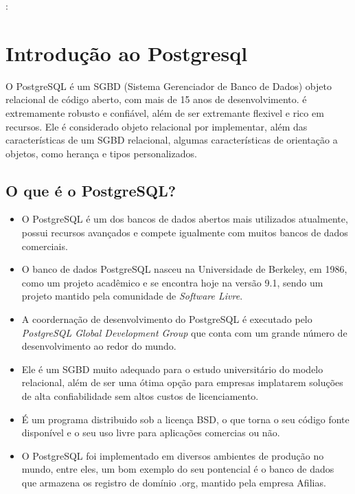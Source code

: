:\newpage \chapter{Introdução ao Postgresql}\setcounter{SteP}{1}

    O PostgreSQL é um SGBD (Sistema Gerenciador de Banco de
Dados) objeto relacional de código aberto, com mais de 15 anos
de desenvolvimento. é extremamente robusto e confiável, além de
ser extremante flexivel e rico em recursos. Ele é considerado 
objeto relacional por implementar, além das características de
um SGBD relacional, algumas características de orientação a
objetos, como herança e tipos personalizados.

\section{O que é o PostgreSQL?}\setcounter{SteP}{1}

\begin{itemize}
\item{\bf } O PostgreSQL é um dos bancos de dados abertos mais utilizados
atualmente, possui recursos avançados e compete igualmente com
muitos bancos de dados comerciais.

\item{\bf } O banco de dados PostgreSQL nasceu na Universidade de Berkeley,
em 1986, como um projeto acadêmico e se encontra hoje na versão 9.1, 
sendo um projeto mantido pela comunidade de {\it Software Livre}.

\item{\bf }A coordernação de desenvolvimento do PostgreSQL é executado pelo 
{\it PostgreSQL Global Development Group} que conta com um grande 
número de desenvolvimento ao redor do mundo.

\item{\bf } Ele é um SGBD muito adequado para o estudo universitário do 
modelo relacional, além de ser uma ótima opção para empresas 
implatarem soluções de alta confiabilidade sem altos custos de 
licenciamento.

\item{\bf } É um programa distribuido sob a licença BSD, o que 
torna o seu código fonte disponível e o seu uso livre para aplicações
comercias ou não.

\item{\bf } O PostgreSQL foi implementado em diversos ambientes de produção 
no mundo, entre eles, um bom exemplo do seu pontencial é o banco de dados
que armazena os registro de domínio .org, mantido pela empresa
	Afilias.
\end{itemize}

